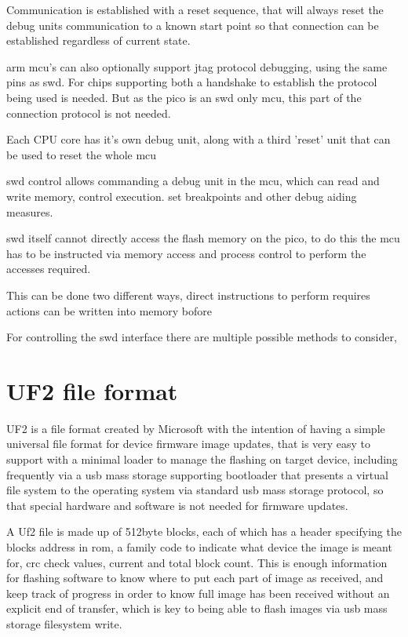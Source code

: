 Communication is established with a reset sequence, that will always reset the debug units communication to a known start point so that connection can be established regardless of current state.

\gls{arm} \gls{mcu}'s can also optionally support \gls{jtag} protocol debugging, using the same pins as \gls{swd}. For chips supporting both a handshake to establish the protocol being used is needed. But as the pico is an \gls{swd} only \gls{mcu}, this part of the connection protocol is not needed.

Each CPU core has it's own debug unit, along with a third 'reset' unit that can be used to reset the whole \gls{mcu}

\gls{swd}  control allows commanding a debug unit in the \gls{mcu}, which can read and write memory, control execution. set breakpoints and other debug aiding measures.

\gls{swd} itself cannot directly access the flash memory on the pico, to do this the \gls{mcu} has to be instructed via memory access and process control to perform the accesses required.

This can be done two different ways, direct instructions to perform requires actions can be written into memory
bofore

For controlling the \gls{swd} interface there are multiple possible methods to consider,
\clearpage
\section{UF2 file format}
UF2 is a file format created by Microsoft with the intention of having a simple universal file format for device firmware image updates, that is very easy to support with a minimal loader to manage the flashing on target device, including frequently via a \gls{usb} mass storage supporting bootloader that presents a virtual file system to the operating system via standard \gls{usb} mass storage protocol, so that special hardware and software is not needed for firmware updates.


A Uf2 file is made up of 512byte blocks, each of which has a header specifying the blocks address in \gls{rom}, a family code to indicate what device the image is meant for, \gls{crc} check values, current and total block count. This is enough information for flashing software to know where to put each part of image as received, and keep track of progress in order to know full image has been received without an explicit end of transfer, which is key to being able to flash images via \gls{usb} mass storage filesystem write.

